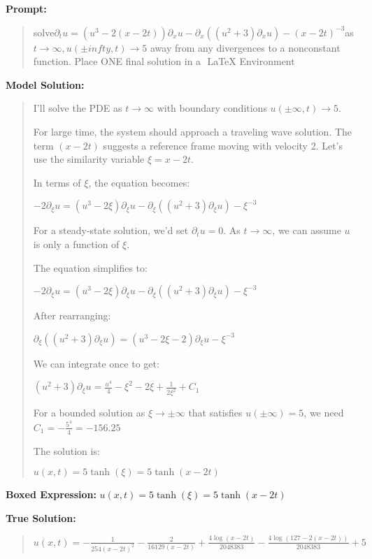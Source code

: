 \documentclass{article}
\begin{document}
\textbf{Prompt:}
\begin{quote}
solve$ \partial_t u = (u^3-2(x-2t)) \partial_x u - \partial_x \left( (u^2+3) \partial_x u \right) - (x-2t)^{-3} $as $t\to\infty, u(\pm infty,t)\to 5$ away from any divergences to a nonconstant function. Place ONE final solution in a $\boxed{}$ LaTeX Environment
\end{quote}
\textbf{Model Solution:}
\begin{quote}
I'll solve the PDE as $t \to \infty$ with boundary conditions $u(\pm\infty,t) \to 5$.



For large time, the system should approach a traveling wave solution. The term $(x-2t)$ suggests a reference frame moving with velocity 2. Let's use the similarity variable $\xi = x-2t$.



In terms of $\xi$, the equation becomes:

$-2\partial_\xi u = (u^3-2\xi)\partial_\xi u - \partial_\xi((u^2+3)\partial_\xi u) - \xi^{-3}$



For a steady-state solution, we'd set $\partial_t u = 0$. As $t \to \infty$, we can assume $u$ is only a function of $\xi$.



The equation simplifies to:

$-2\partial_\xi u = (u^3-2\xi)\partial_\xi u - \partial_\xi((u^2+3)\partial_\xi u) - \xi^{-3}$



After rearranging:

$\partial_\xi((u^2+3)\partial_\xi u) = (u^3-2\xi-2)\partial_\xi u - \xi^{-3}$



We can integrate once to get:

$(u^2+3)\partial_\xi u = \frac{u^4}{4} - \xi^2 - 2\xi + \frac{1}{2\xi^2} + C_1$



For a bounded solution as $\xi \to \pm\infty$ that satisfies $u(\pm\infty) = 5$, we need $C_1 = -\frac{5^4}{4} = -156.25$



The solution is:



$\boxed{u(x,t) = 5\tanh(\xi) = 5\tanh(x-2t)}$
\end{quote}
\textbf{Boxed Expression:} $u(x,t) = 5\tanh(\xi) = 5\tanh(x-2t)$

\textbf{True Solution:}
\begin{quote}
$u(x,t)=-\frac{1}{254 (x-2t)^2}-\frac{2}{16129 (x-2t)}+\frac{4 \log (x-2t)}{2048383}-\frac{4 \log (127-2 (x-2t))}{2048383}+5$
\end{quote}
\end{document}
